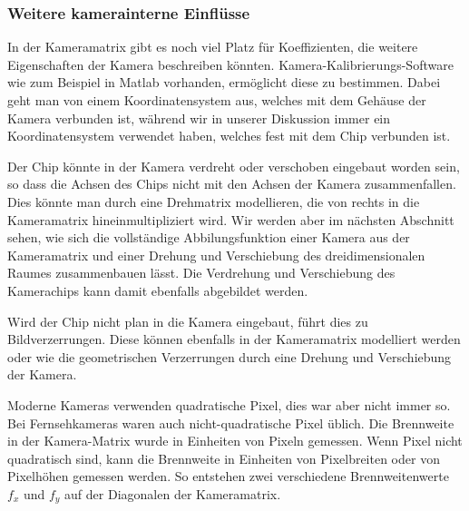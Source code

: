 \subsubsection{Weitere kamerainterne Einflüsse}
In der Kameramatrix gibt es noch viel Platz für Koeffizienten, die
weitere Eigenschaften der Kamera beschreiben könnten.
Kamera-Kalibrierungs-Software wie zum Beispiel in Matlab vorhanden,
ermöglicht diese zu bestimmen.
Dabei geht man von einem Koordinatensystem aus, welches mit dem Gehäuse
der Kamera verbunden ist, während wir in unserer Diskussion immer
ein Koordinatensystem verwendet haben, welches fest mit dem Chip
verbunden ist.

Der Chip könnte in der Kamera verdreht oder verschoben eingebaut worden sein,
so dass die Achsen des Chips nicht mit den Achsen der Kamera zusammenfallen.
Dies könnte man durch eine Drehmatrix modellieren, die von rechts in die
Kameramatrix hineinmultipliziert wird.
Wir werden aber im nächsten Abschnitt sehen, wie sich die vollständige
Abbilungsfunktion einer Kamera aus der Kameramatrix und einer Drehung
und Verschiebung des dreidimensionalen Raumes zusammenbauen lässt.
Die Verdrehung und Verschiebung des Kamerachips kann damit ebenfalls
abgebildet werden.

Wird der Chip nicht plan in die Kamera eingebaut, führt dies
zu Bildverzerrungen.
Diese können ebenfalls in der Kameramatrix modelliert werden
oder wie die geometrischen Verzerrungen durch eine Drehung und
Verschiebung der Kamera.

Moderne Kameras verwenden quadratische Pixel, dies war aber nicht
immer so.
Bei Fernsehkameras waren auch nicht-quadratische Pixel üblich.
Die Brennweite in der Kamera-Matrix wurde in Einheiten von Pixeln
gemessen.
Wenn Pixel nicht quadratisch sind, kann die Brennweite in Einheiten von
Pixelbreiten oder von Pixelhöhen gemessen werden.
So entstehen zwei verschiedene Brennweitenwerte $f_x$ und $f_y$ auf der
Diagonalen der Kameramatrix.


